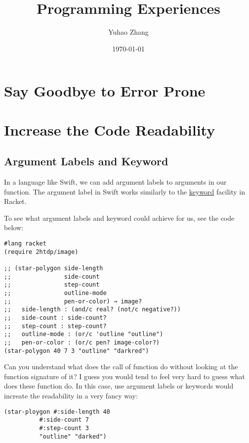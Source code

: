 \documentclass[11pt]{article}
\author{Yuhao Zhang}
\date{\today}
\title{Programming Experiences}
\begin{document}
\maketitle
\tableofcontents


\section{Say Goodbye to Error Prone}
\label{sec:orgfb2b26c}

\section{Increase the Code Readability}
\label{sec:orgc1bb8de}
\subsection{Argument Labels and Keyword}
\label{sec:org62a6366}

In a language like Swift, we can add argument labels to arguments in our function. The argument label in Swift works similarly to the \href{https://docs.racket-lang.org/guide/application.html\#\%2528part.\_keyword-args\%2529}{keyword} facility in Racket.

To see what argument labels and keyword could achieve for us, see the code below:

\begin{verbatim}
#lang racket
(require 2htdp/image)

;; (star-polygon side-length	 	 	 	 
;;               side-count	 	 	 	 
;;               step-count
;;               outline-mode	 	 	 	 
;;               pen-or-color) → image?
;;   side-length : (and/c real? (not/c negative?))
;;   side-count : side-count?
;;   step-count : step-count?
;;   outline-mode : (or/c 'outline "outline")
;;   pen-or-color : (or/c pen? image-color?)
(star-polygon 40 7 3 "outline" "darkred")
\end{verbatim}

Can you understand what does the call of function do without looking at the function signature of it? I guess you would tend to feel very hard to guess what does these function do. In this case, use argument labels or keywords would increate the readability in a very fancy way:

\begin{verbatim}
(star-ploygon #:side-length 40
	      #:side-count 7
	      #:step-count 3
	      "outline" "darked")
\end{verbatim}
\end{document}
